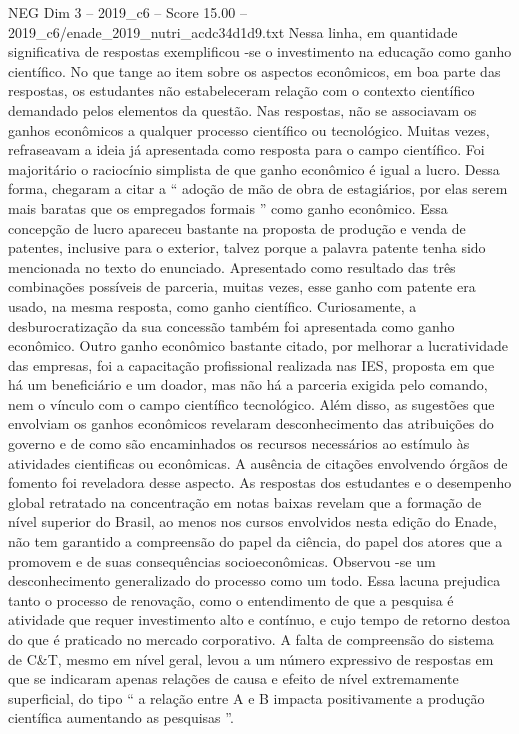 \begin{textsample}{NEG Dim 3 – 2019\_c6 – Score 15.00 – 2019\_c6/enade\_2019\_nutri\_acdc34d1d9.txt}
Nessa linha, em quantidade significativa de respostas exemplificou -se o investimento na educação como ganho científico.
No que tange ao item sobre os aspectos econômicos, em boa parte das respostas, os estudantes não estabeleceram relação com o contexto científico demandado pelos elementos da questão.
Nas respostas, não se associavam os ganhos econômicos a qualquer processo científico ou tecnológico.
Muitas vezes, refraseavam a ideia já apresentada como resposta para o campo científico.
Foi majoritário o raciocínio simplista de que ganho econômico é igual a lucro.
Dessa forma, chegaram a citar a “ adoção de mão de obra de estagiários, por elas serem mais baratas que os empregados formais ” como ganho econômico.
Essa concepção de lucro apareceu bastante na proposta de produção e venda de patentes, inclusive para o exterior, talvez porque a palavra patente tenha sido mencionada no texto do enunciado.
Apresentado como resultado das três combinações possíveis de parceria, muitas vezes, esse ganho com patente era usado, na mesma resposta, como ganho científico.
Curiosamente, a desburocratização da sua concessão também foi apresentada como ganho econômico.
Outro ganho econômico bastante citado, por melhorar a lucratividade das empresas, foi a capacitação profissional realizada nas IES, proposta em que há um beneficiário e um doador, mas não há a parceria exigida pelo comando, nem o vínculo com o campo científico tecnológico.
Além disso, as sugestões que envolviam os ganhos econômicos revelaram desconhecimento das atribuições do governo e de como são encaminhados os recursos necessários ao estímulo às atividades cientificas ou econômicas.
A ausência de citações envolvendo órgãos de fomento foi reveladora desse aspecto.
As respostas dos estudantes e o desempenho global retratado na concentração em notas baixas revelam que a formação de nível superior do Brasil, ao menos nos cursos envolvidos nesta edição do Enade, não tem garantido a compreensão do papel da ciência, do papel dos atores que a promovem e de suas consequências socioeconômicas.
Observou -se um desconhecimento generalizado do processo como um todo.
Essa lacuna prejudica tanto o processo de renovação, como o entendimento de que a pesquisa é atividade que requer investimento alto e contínuo, e cujo tempo de retorno destoa do que é praticado no mercado corporativo.
A falta de compreensão do sistema de C\&T, mesmo em nível geral, levou a um número expressivo de respostas em que se indicaram apenas relações de causa e efeito de nível extremamente superficial, do tipo “ a relação entre A e B impacta positivamente a produção científica aumentando as pesquisas ”.

\end{textsample}
